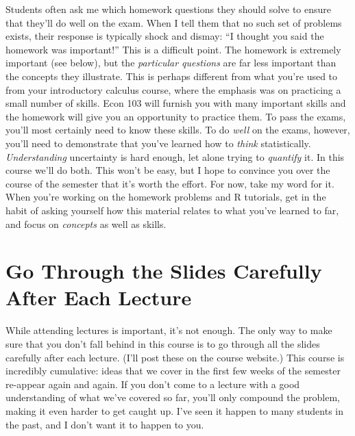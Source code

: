 \documentclass[12pt,letterpaper]{article}
\begin{document}
Students often ask me which homework questions they should solve to ensure that they'll do well on the exam. When I tell them that no such set of problems exists, their response is typically shock and dismay: ``I thought you said the homework was important!'' This is a difficult point. The homework is extremely important (see below), but the \emph{particular questions} are far less important than the concepts they illustrate. This is perhaps different from what you're used to from your introductory calculus course, where the emphasis was on practicing a small number of skills. Econ 103 will furnish you with many important skills and the homework will give you an opportunity to practice them. To pass the exams, you'll most certainly need to know these skills. To do \emph{well} on the exams, however, you'll need to demonstrate that you've learned how to \emph{think} statistically. \emph{Understanding} uncertainty is hard enough, let alone trying to \emph{quantify} it. In this course we'll do both. This won't be easy, but I hope to convince you over the course of the semester that it's worth the effort. For now, take my word for it. When you're working on the homework problems and R tutorials, get in the habit of asking yourself how this material relates to what you've learned to far, and focus on \emph{concepts} as well as skills.


\section{Go Through the Slides Carefully After Each Lecture}
While attending lectures is important, it's not enough. 
The only way to make sure that you don't fall behind in this course is to go through all the slides carefully after each lecture.
(I'll post these on the course website.)
This course is incredibly cumulative: ideas that we cover in the first few weeks of the semester re-appear again and again.
If you don't come to a lecture with a good understanding of what we've covered so far, you'll only compound the problem, making it even harder to get caught up.
I've seen it happen to many students in the past, and I don't want it to happen to you.
\end{document}
